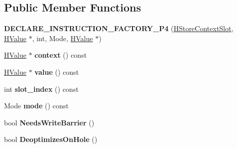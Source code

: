 \subsection*{Public Member Functions}
\begin{DoxyCompactItemize}
\item 
{\bfseries D\+E\+C\+L\+A\+R\+E\+\_\+\+I\+N\+S\+T\+R\+U\+C\+T\+I\+O\+N\+\_\+\+F\+A\+C\+T\+O\+R\+Y\+\_\+\+P4} (\hyperlink{classv8_1_1internal_1_1_h_store_context_slot}{H\+Store\+Context\+Slot}, \hyperlink{classv8_1_1internal_1_1_h_value}{H\+Value} $\ast$, int, Mode, \hyperlink{classv8_1_1internal_1_1_h_value}{H\+Value} $\ast$)\hypertarget{classv8_1_1internal_1_1_h_store_context_slot_a1e8be24f16ee67fd42820319c9397e4e}{}\label{classv8_1_1internal_1_1_h_store_context_slot_a1e8be24f16ee67fd42820319c9397e4e}

\item 
\hyperlink{classv8_1_1internal_1_1_h_value}{H\+Value} $\ast$ {\bfseries context} () const \hypertarget{classv8_1_1internal_1_1_h_store_context_slot_a75680ae4717c9b6535bec90a93ed2546}{}\label{classv8_1_1internal_1_1_h_store_context_slot_a75680ae4717c9b6535bec90a93ed2546}

\item 
\hyperlink{classv8_1_1internal_1_1_h_value}{H\+Value} $\ast$ {\bfseries value} () const \hypertarget{classv8_1_1internal_1_1_h_store_context_slot_a53b1c44d3a9a6e3a0d3be13607cbc865}{}\label{classv8_1_1internal_1_1_h_store_context_slot_a53b1c44d3a9a6e3a0d3be13607cbc865}

\item 
int {\bfseries slot\+\_\+index} () const \hypertarget{classv8_1_1internal_1_1_h_store_context_slot_acf85a40b6f0779421327ca0c386cdbc6}{}\label{classv8_1_1internal_1_1_h_store_context_slot_acf85a40b6f0779421327ca0c386cdbc6}

\item 
Mode {\bfseries mode} () const \hypertarget{classv8_1_1internal_1_1_h_store_context_slot_a2767ca611eaf0d490ab8124f31c93b8a}{}\label{classv8_1_1internal_1_1_h_store_context_slot_a2767ca611eaf0d490ab8124f31c93b8a}

\item 
bool {\bfseries Needs\+Write\+Barrier} ()\hypertarget{classv8_1_1internal_1_1_h_store_context_slot_a95a2bb9bdd9c4f1a91abcd0b8514f654}{}\label{classv8_1_1internal_1_1_h_store_context_slot_a95a2bb9bdd9c4f1a91abcd0b8514f654}

\item 
bool {\bfseries Deoptimizes\+On\+Hole} ()\hypertarget{classv8_1_1internal_1_1_h_store_context_slot_a930d58f750bf79f9d8f56ed5d6ae9082}{}\label{classv8_1_1internal_1_1_h_store_context_slot_a930d58f750bf79f9d8f56ed5d6ae9082}


\end{DoxyCompactItemize}
